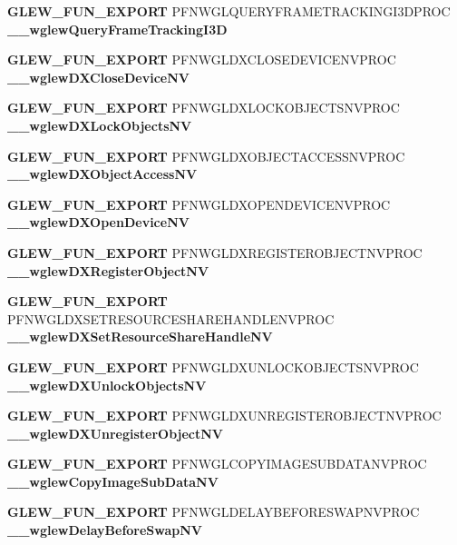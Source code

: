 \begin{DoxyCompactItemize}
\item 
{\bf G\+L\+E\+W\+\_\+\+F\+U\+N\+\_\+\+E\+X\+P\+O\+RT} P\+F\+N\+W\+G\+L\+Q\+U\+E\+R\+Y\+F\+R\+A\+M\+E\+T\+R\+A\+C\+K\+I\+N\+G\+I3\+D\+P\+R\+OC {\bf \+\_\+\+\_\+wglew\+Query\+Frame\+Tracking\+I3D}
\item 
{\bf G\+L\+E\+W\+\_\+\+F\+U\+N\+\_\+\+E\+X\+P\+O\+RT} P\+F\+N\+W\+G\+L\+D\+X\+C\+L\+O\+S\+E\+D\+E\+V\+I\+C\+E\+N\+V\+P\+R\+OC {\bf \+\_\+\+\_\+wglew\+D\+X\+Close\+Device\+NV}
\item 
{\bf G\+L\+E\+W\+\_\+\+F\+U\+N\+\_\+\+E\+X\+P\+O\+RT} P\+F\+N\+W\+G\+L\+D\+X\+L\+O\+C\+K\+O\+B\+J\+E\+C\+T\+S\+N\+V\+P\+R\+OC {\bf \+\_\+\+\_\+wglew\+D\+X\+Lock\+Objects\+NV}
\item 
{\bf G\+L\+E\+W\+\_\+\+F\+U\+N\+\_\+\+E\+X\+P\+O\+RT} P\+F\+N\+W\+G\+L\+D\+X\+O\+B\+J\+E\+C\+T\+A\+C\+C\+E\+S\+S\+N\+V\+P\+R\+OC {\bf \+\_\+\+\_\+wglew\+D\+X\+Object\+Access\+NV}
\item 
{\bf G\+L\+E\+W\+\_\+\+F\+U\+N\+\_\+\+E\+X\+P\+O\+RT} P\+F\+N\+W\+G\+L\+D\+X\+O\+P\+E\+N\+D\+E\+V\+I\+C\+E\+N\+V\+P\+R\+OC {\bf \+\_\+\+\_\+wglew\+D\+X\+Open\+Device\+NV}
\item 
{\bf G\+L\+E\+W\+\_\+\+F\+U\+N\+\_\+\+E\+X\+P\+O\+RT} P\+F\+N\+W\+G\+L\+D\+X\+R\+E\+G\+I\+S\+T\+E\+R\+O\+B\+J\+E\+C\+T\+N\+V\+P\+R\+OC {\bf \+\_\+\+\_\+wglew\+D\+X\+Register\+Object\+NV}
\item 
{\bf G\+L\+E\+W\+\_\+\+F\+U\+N\+\_\+\+E\+X\+P\+O\+RT} P\+F\+N\+W\+G\+L\+D\+X\+S\+E\+T\+R\+E\+S\+O\+U\+R\+C\+E\+S\+H\+A\+R\+E\+H\+A\+N\+D\+L\+E\+N\+V\+P\+R\+OC {\bf \+\_\+\+\_\+wglew\+D\+X\+Set\+Resource\+Share\+Handle\+NV}
\item 
{\bf G\+L\+E\+W\+\_\+\+F\+U\+N\+\_\+\+E\+X\+P\+O\+RT} P\+F\+N\+W\+G\+L\+D\+X\+U\+N\+L\+O\+C\+K\+O\+B\+J\+E\+C\+T\+S\+N\+V\+P\+R\+OC {\bf \+\_\+\+\_\+wglew\+D\+X\+Unlock\+Objects\+NV}
\item 
{\bf G\+L\+E\+W\+\_\+\+F\+U\+N\+\_\+\+E\+X\+P\+O\+RT} P\+F\+N\+W\+G\+L\+D\+X\+U\+N\+R\+E\+G\+I\+S\+T\+E\+R\+O\+B\+J\+E\+C\+T\+N\+V\+P\+R\+OC {\bf \+\_\+\+\_\+wglew\+D\+X\+Unregister\+Object\+NV}
\item 
{\bf G\+L\+E\+W\+\_\+\+F\+U\+N\+\_\+\+E\+X\+P\+O\+RT} P\+F\+N\+W\+G\+L\+C\+O\+P\+Y\+I\+M\+A\+G\+E\+S\+U\+B\+D\+A\+T\+A\+N\+V\+P\+R\+OC {\bf \+\_\+\+\_\+wglew\+Copy\+Image\+Sub\+Data\+NV}
\item 
{\bf G\+L\+E\+W\+\_\+\+F\+U\+N\+\_\+\+E\+X\+P\+O\+RT} P\+F\+N\+W\+G\+L\+D\+E\+L\+A\+Y\+B\+E\+F\+O\+R\+E\+S\+W\+A\+P\+N\+V\+P\+R\+OC {\bf \+\_\+\+\_\+wglew\+Delay\+Before\+Swap\+NV}
\item 

\end{DoxyCompactItemize}
